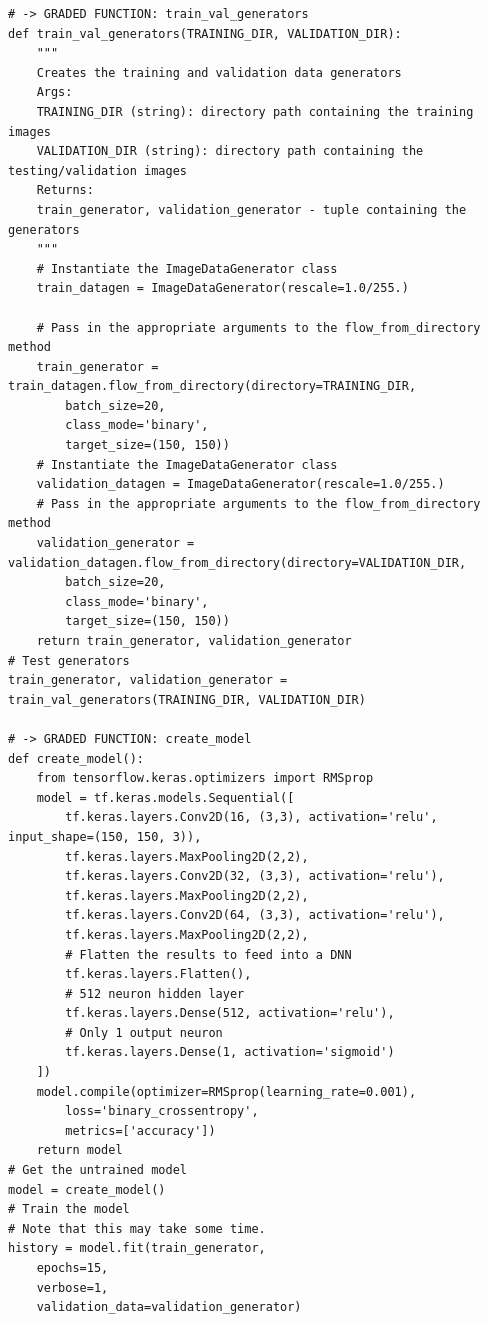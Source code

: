 \documentclass[20pt]{article}
\begin{document}
\begin{itemize}
\begin{verbatim}
# -> GRADED FUNCTION: train_val_generators
def train_val_generators(TRAINING_DIR, VALIDATION_DIR):
	"""
	Creates the training and validation data generators
	Args:
	TRAINING_DIR (string): directory path containing the training images
	VALIDATION_DIR (string): directory path containing the testing/validation images
	Returns:
	train_generator, validation_generator - tuple containing the generators
	"""
	# Instantiate the ImageDataGenerator class
	train_datagen = ImageDataGenerator(rescale=1.0/255.)

	# Pass in the appropriate arguments to the flow_from_directory method
	train_generator = train_datagen.flow_from_directory(directory=TRAINING_DIR,
		batch_size=20,
		class_mode='binary',
		target_size=(150, 150))
	# Instantiate the ImageDataGenerator class 
	validation_datagen = ImageDataGenerator(rescale=1.0/255.)
	# Pass in the appropriate arguments to the flow_from_directory method
	validation_generator = validation_datagen.flow_from_directory(directory=VALIDATION_DIR,
		batch_size=20,
		class_mode='binary',
		target_size=(150, 150))
	return train_generator, validation_generator
# Test generators
train_generator, validation_generator = train_val_generators(TRAINING_DIR, VALIDATION_DIR)

# -> GRADED FUNCTION: create_model
def create_model():
	from tensorflow.keras.optimizers import RMSprop
	model = tf.keras.models.Sequential([ 
		tf.keras.layers.Conv2D(16, (3,3), activation='relu', input_shape=(150, 150, 3)),
		tf.keras.layers.MaxPooling2D(2,2),
		tf.keras.layers.Conv2D(32, (3,3), activation='relu'),
		tf.keras.layers.MaxPooling2D(2,2), 
		tf.keras.layers.Conv2D(64, (3,3), activation='relu'), 
		tf.keras.layers.MaxPooling2D(2,2),
		# Flatten the results to feed into a DNN
		tf.keras.layers.Flatten(), 
		# 512 neuron hidden layer
		tf.keras.layers.Dense(512, activation='relu'), 
		# Only 1 output neuron
		tf.keras.layers.Dense(1, activation='sigmoid')  
	])
	model.compile(optimizer=RMSprop(learning_rate=0.001),
		loss='binary_crossentropy',
		metrics=['accuracy']) 
	return model
# Get the untrained model
model = create_model()
# Train the model
# Note that this may take some time.
history = model.fit(train_generator,
	epochs=15,
	verbose=1,
	validation_data=validation_generator)


\end{verbatim}
\end{itemize}
\end{document}
